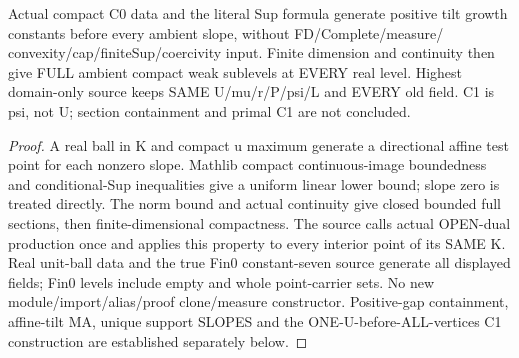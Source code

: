 \begin{lemma}
  \label{lem:coercive-dual-sections}
  \leanok
  Actual compact C0 data and the literal Sup formula generate positive tilt
  growth constants before every ambient slope, without FD/Complete/measure/
  convexity/cap/finiteSup/coercivity input. Finite dimension and continuity
  then give FULL ambient compact weak sublevels at EVERY real level.
  Highest domain-only source keeps SAME U/mu/r/P/psi/L and EVERY old field.
  C1 is psi, not U; section containment and primal C1 are not concluded.
\end{lemma}
\begin{proof}
  \leanok
  A real ball in K and compact u maximum generate a directional affine test
  point for each nonzero slope. Mathlib compact continuous-image boundedness
  and conditional-Sup inequalities give a uniform linear lower bound; slope
  zero is treated directly. The norm bound and actual continuity give closed
  bounded full sections, then finite-dimensional compactness. The source calls
  actual OPEN-dual production once and applies this property to every interior
  point of its SAME K. Real unit-ball data and the true Fin0 constant-seven
  source generate all displayed fields; Fin0 levels include empty and whole
  point-carrier sets. No new module/import/alias/proof clone/measure constructor.
  Positive-gap containment, affine-tilt MA, unique support SLOPES and the
  ONE-U-before-ALL-vertices C1 construction are established separately below.
\end{proof}


